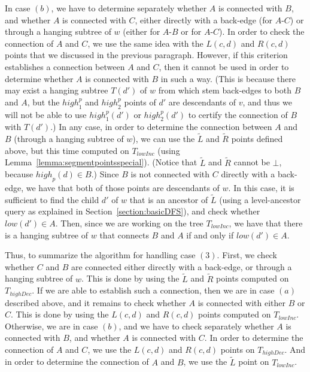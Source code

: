 \documentclass[11pt,a4paper]{article}
\begin{document}
In case $(b)$, we have to determine separately whether $A$ is connected with $B$, and whether $A$ is connected with $C$, either directly with a back-edge (for $A$-$C$) or through a hanging subtree of $w$ (either for $A$-$B$ or for $A$-$C$). In order to check the connection of $A$ and $C$, we use the same idea with the $L(c,d)$ and $R(c,d)$ points that we discussed in the previous paragraph. However, if this criterion establishes a connection between $A$ and $C$, then it cannot be used in order to determine whether $A$ is connected with $B$ in such a way. (This is because there may exist a hanging subtree $T(d')$ of $w$ from which stem back-edges to both $B$ and $A$, but the $\mathit{high}^p_1$ and $\mathit{high}^p_2$ points of $d'$ are descendants of $v$, and thus we will not be able to use $\mathit{high}^p_1(d')$ or $\mathit{high}^p_2(d')$ to certify the connection of $B$ with $T(d')$.) In any case, in order to determine the connection between $A$ and $B$ (through a hanging subtree of $w$), we can use the $\widetilde{L}$ and $\widetilde{R}$ points defined above, but this time computed on $T_\mathit{lowInc}$ (using Lemma~\ref{lemma:segmentpointsspecial}). (Notice that $\widetilde{L}$ and $\widetilde{R}$ cannot be $\bot$, because $\mathit{high}_p(d)\in B$.) Since $B$ is not connected with $C$ directly with a back-edge, we have that both of those points are descendants of $w$. In this case, it is sufficient to find the child $d'$ of $w$ that is an ancestor of $\widetilde{L}$ (using a level-ancestor query as explained in Section~\ref{section:basicDFS}), and check whether $\mathit{low}(d')\in A$. Then, since we are working on the tree $T_\mathit{lowInc}$, we have that there is a hanging subtree of $w$ that connects $B$ and $A$ if and only if $\mathit{low}(d')\in A$. 

Thus, to summarize the algorithm for handling case $(3)$. First, we check whether $C$ and $B$ are connected either directly with a back-edge, or through a hanging subtree of $w$. This is done by using the $\widetilde{L}$ and $\widetilde{R}$ points computed on $T_\mathit{highDec}$. If we are able to establish such a connection, then we are in case $(a)$ described above, and it remains to check whether $A$ is connected with either $B$ or $C$. This is done by using the $L(c,d)$ and $R(c,d)$ points computed on $T_\mathit{lowInc}$. Otherwise, we are in case $(b)$, and we have to check separately whether $A$ is connected with $B$, and whether $A$ is connected with $C$. In order to determine the connection of $A$ and $C$, we use the $L(c,d)$ and $R(c,d)$ points on $T_\mathit{highDec}$. And in order to determine the connection of $A$ and $B$, we use the $\widetilde{L}$ point on $T_\mathit{lowInc}$.
\end{document}
